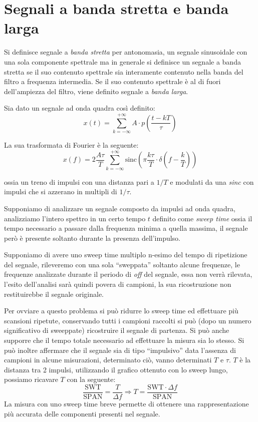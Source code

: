 \section{Segnali a banda stretta e banda larga}
Si definisce segnale a \textit{banda stretta} per antonomasia, un segnale sinusoidale
con una sola componente spettrale ma in generale
si definisce un segnale a banda stretta se il suo contenuto spettrale
sia interamente contenuto nella banda del filtro a frequenza intermedia.
Se il suo contenuto spettrale è al di fuori dell'ampiezza del filtro,
viene definito segnale a \textit{banda larga}.

Sia dato un segnale ad onda quadra così definito:
$$
x(t) = \sum_{k = -\infty}^{+\infty} A\cdot p\left(\frac{t-kT}{\tau}\right)
$$

La sua trasformata di Fourier è la seguente:
$$
x(f) = 2 \frac{A\tau}{T} \sum_{k=-\infty}^{+\infty} \text{sinc} \left(\pi \frac{k\tau}{T}\cdot  \delta\left(f-\frac{k}{T}\right)  \right)
$$

ossia un treno di impulsi con una distanza pari a $1/T$ e modulati
da una \textit{sinc} con impulsi che si azzerano in multipli di $1/\tau$.

Supponiamo di analizzare un segnale composto da impulsi ad onda quadra,
analizziamo l'intero spettro in un certo tempo $t$ definito come \textit{sweep time}
ossia il tempo necessario a passare dalla frequenza minima a quella massima,
il segnale però è presente soltanto durante la presenza dell'impulso.

\begin{figure}[h] %
    \centering
    \def\svgwidth{0.6\columnwidth}
    
\end{figure}


Supponiamo di avere uno sweep time multiplo n-esimo
del tempo di ripetizione del segnale, rileveremo con una sola ``sweppata''
soltanto alcune frequenze, le frequenze analizzate durante il periodo di \textit{off}
del segnale, essa non verrà rilevata, l'esito dell'analisi sarà quindi povera di campioni,
la sua ricostruzione non restituirebbe il segnale originale.

Per ovviare a questo problema si può ridurre lo sweep time ed effettuare più scansioni
ripetute, conservando tutti i campioni raccolti si può (dopo un numero significativo di sweeppate)
ricostruire il segnale di partenza. Si può anche supporre che il tempo totale necessario ad effettuare
la misura sia lo stesso.
Si può inoltre affermare che il segnale sia di tipo ``impulsivo'' data l'assenza di campioni in
alcune misurazioni, determinato ciò, vanno determinati $T$ e $\tau$.
$T$ è la distanza tra 2 impulsi, utilizzando il grafico ottenuto con lo sweep lungo,
possiamo ricavare $T$ con la seguente:
$$
    \frac{\text{SWT}}{\text{SPAN}} = \frac{T}{\Delta f} \Rightarrow T = \frac{\text{SWT}\cdot\Delta f}{\text{SPAN}}
$$
La misura con uno sweep time breve permette di ottenere una rappresentazione
più accurata delle componenti presenti nel segnale.

